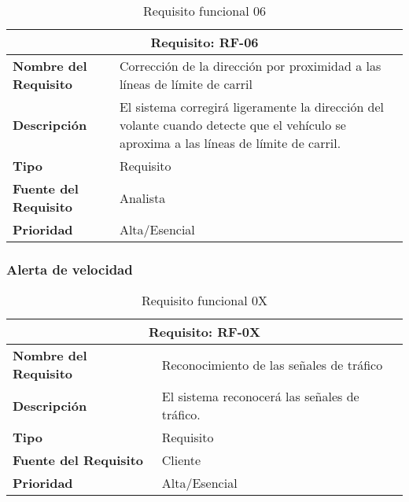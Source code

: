 \documentclass[10pt,a4paper,oldfontcommands]{dpds}
\begin{document}
\begin{table}[H]
\begin{center}
\begin{tabular}{p{} p{7cm}}
\multicolumn{2}{c}{\textbf{Requisito: RF-06} } \\
\hline \hline
\textbf{Nombre del Requisito} &  Corrección de la dirección por proximidad a las líneas de límite de carril\\
\textbf{Descripción} & El sistema corregirá ligeramente la dirección del volante cuando detecte que el vehículo se aproxima a las líneas de límite de carril. \\
\textbf{Tipo} & Requisito  \\
\textbf{Fuente del Requisito} & Analista  \\
\textbf{Prioridad} & Alta/Esencial  \\ \hline
\end{tabular}
\caption{Requisito funcional 06}
\label{tab:RF-06}
\end{center}
\end{table}


\subsubsection{Alerta de velocidad}

\begin{table}[H]
\begin{center}
\begin{tabular}{p{} p{7cm}}
\multicolumn{2}{c}{\textbf{Requisito: RF-0X} } \\
\hline \hline
\textbf{Nombre del Requisito} & Reconocimiento de las señales de tráfico \\
\textbf{Descripción} & El sistema reconocerá las señales de tráfico. \\
\textbf{Tipo} & Requisito  \\
\textbf{Fuente del Requisito} & Cliente  \\
\textbf{Prioridad} & Alta/Esencial  \\ \hline
\end{tabular}
\caption{Requisito funcional 0X}
\label{tab:personal}
\end{center}
\end{table}
\end{document}
